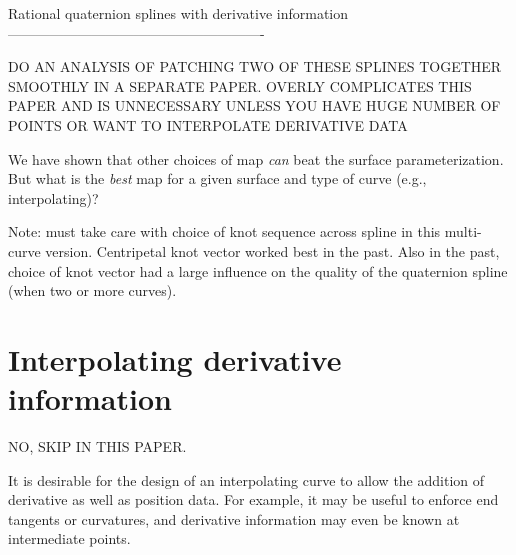 Rational quaternion splines with derivative information
-------------------------------------------------------

DO AN ANALYSIS OF PATCHING TWO OF THESE SPLINES TOGETHER SMOOTHLY
IN A SEPARATE PAPER.  OVERLY COMPLICATES THIS PAPER
AND IS UNNECESSARY UNLESS YOU HAVE HUGE NUMBER OF POINTS
OR WANT TO INTERPOLATE DERIVATIVE DATA

We have shown that other choices of map {\em can} beat the surface
parameterization.
But what is the {\em best} map for a given surface and type of curve (e.g., interpolating)?

Note: must take care with choice of knot sequence across spline
in this multi-curve version.
Centripetal knot vector worked best in the past.
Also in the past, choice of knot vector had a large influence on the 
quality of the quaternion spline (when two or more curves).

\section{Interpolating derivative information}
\label{sec:deriv}

NO, SKIP IN THIS PAPER.

It is desirable for the design of an interpolating curve to allow the 
addition of derivative as well as position data.
For example, it may be useful to enforce end tangents or curvatures,
and derivative information may even be known at intermediate points.





